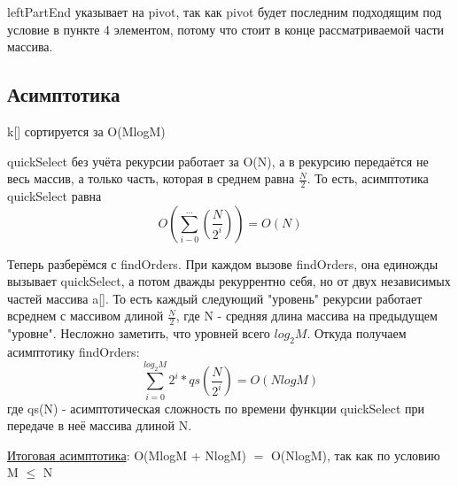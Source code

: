 leftPartEnd указывает на pivot, так как pivot будет последним подходящим под условие в пункте 4 элементом, потому что стоит в конце рассматриваемой части массива.

\subsection{Асимптотика}
k[] сортируется за O(MlogM)

quickSelect без учёта рекурсии работает за O(N), а в рекурсию передаётся не весь массив, а только часть, которая в среднем равна $\frac{N}{2}$. То есть, асимптотика quickSelect равна $$O(\sum_{i-0}^{...}(\frac{N}{2^i})) = O(N)$$

Теперь разберёмся с findOrders. При каждом вызове findOrders, она единожды вызывает quickSelect, а потом дважды рекуррентно себя, но от двух независимых частей массива a[]. То есть каждый следующий "уровень" рекурсии работает всреднем с массивом длиной $\frac{N}{2}$, где N - средняя длина массива на предыдущем "уровне". Несложно заметить, что уровней всего ${log}_2M$. Откуда получаем асимптотику findOrders: $$\sum_{i=0}^{{log}_2M}2^i*qs(\frac{N}{2^i}) = O(NlogM)$$где qs(N) - асимптотическая сложность по времени функции quickSelect при передаче в неё массива длиной N.


\underline{Итоговая асимптотика}: O(MlogM + NlogM) $=$ O(NlogM), так как по условию M $\leq$ N
